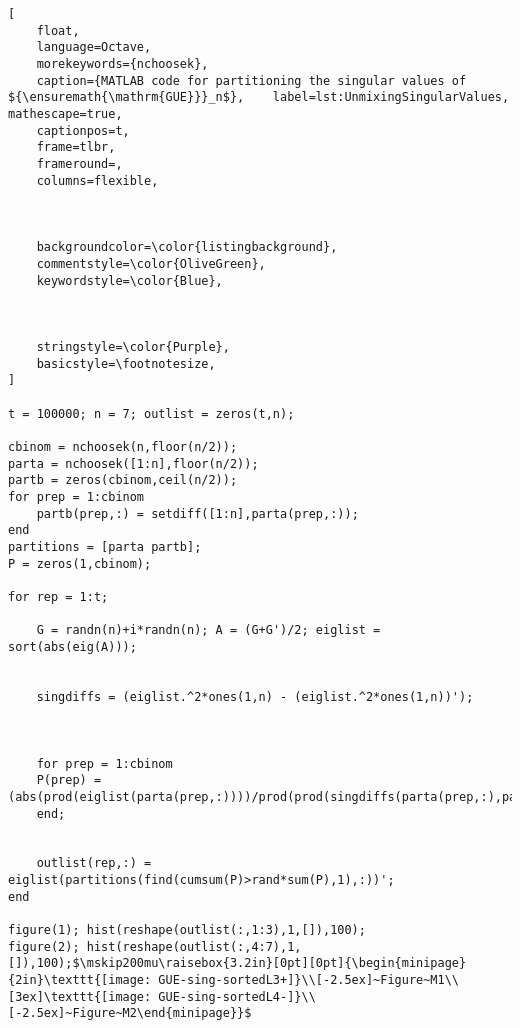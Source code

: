\documentclass[pdftex, oneside, 10pt, letterpaper]{amsart}
\theoremstyle{plain}
\theoremstyle{definition}
\theoremstyle{remark}
\begin{document}
\begin{lstlisting}[
    float, 
    language=Octave, 
    morekeywords={nchoosek}, 
    caption={MATLAB code for partitioning the singular values of ${\ensuremath{\mathrm{GUE}}}_n$},    label=lst:UnmixingSingularValues,    mathescape=true,
    captionpos=t,     
    frame=tlbr,       
    frameround=,  
    columns=flexible, 
                      
                      
                      
    backgroundcolor=\color{listingbackground},
    commentstyle=\color{OliveGreen},
    keywordstyle=\color{Blue},
    
    
    
    stringstyle=\color{Purple},
    basicstyle=\footnotesize,
]

t = 100000; n = 7; outlist = zeros(t,n);

cbinom = nchoosek(n,floor(n/2));      
parta = nchoosek([1:n],floor(n/2));   
partb = zeros(cbinom,ceil(n/2));      
for prep = 1:cbinom
    partb(prep,:) = setdiff([1:n],parta(prep,:));
end
partitions = [parta partb];
P = zeros(1,cbinom);

for rep = 1:t;
    
    G = randn(n)+i*randn(n); A = (G+G')/2; eiglist = sort(abs(eig(A)));

    
    singdiffs = (eiglist.^2*ones(1,n) - (eiglist.^2*ones(1,n))');

    
    
    for prep = 1:cbinom
	P(prep) = (abs(prod(eiglist(parta(prep,:))))/prod(prod(singdiffs(parta(prep,:),partb(prep,:)))))^2;
    end;

    
    outlist(rep,:) = eiglist(partitions(find(cumsum(P)>rand*sum(P),1),:))';
end

figure(1); hist(reshape(outlist(:,1:3),1,[]),100);
figure(2); hist(reshape(outlist(:,4:7),1,[]),100);$\mskip200mu\raisebox{3.2in}[0pt][0pt]{\begin{minipage}{2in}\texttt{[image: GUE-sing-sortedL3+]}\\[-2.5ex]~Figure~M1\\[3ex]\texttt{[image: GUE-sing-sortedL4-]}\\[-2.5ex]~Figure~M2\end{minipage}}$
\end{lstlisting}
\end{document}
